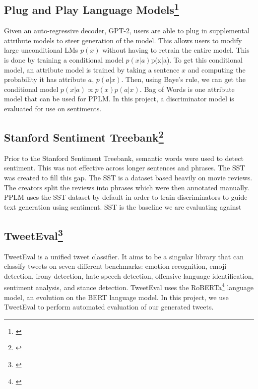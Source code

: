 \documentclass[11pt]{article}
\begin{document}
\subsection{Plug and Play Language Models\footnote{\citep{pplm-paper}}}
Given an auto-regressive decoder, GPT-2, users are able to plug in supplemental attribute models to steer generation of the model.  This allows users to modify large unconditional LMs \begin{math}p(x)\end{math} without having to retrain the entire model.  This is done by training a conditional model \begin{math}p(x|a)\end{math}p(x|a).  To get this conditional model, an attribute model is trained by taking a sentence \begin{math}x\end{math} and computing the probability it has attribute \begin{math}a\end{math}, \begin{math}p(a|x)\end{math}.  Then, using Baye’s rule, we can get the conditional model \begin{math}p(x|a) \propto p(x)p(a|x)\end{math}.  Bag of Words is one attribute model that can be used for PPLM.  In this project, a discriminator model is evaluated for use on sentiments.

\subsection{Stanford Sentiment Treebank\footnote{\citep{sst-paper}}}
Prior to the Stanford Sentiment Treebank, semantic words were used to detect sentiment.  This was not effective across longer sentences and phrases.  The SST was created to fill this gap.  The SST is a dataset based heavily on movie reviews.  The creators split the reviews into phrases which were then annotated manually.  PPLM uses the SST dataset by default in order to train discriminators to guide text generation using sentiment. SST is the baseline we are evaluating against

\subsection{TweetEval\footnote{\citep{tweet-eval-paper}}}
TweetEval is a unified tweet classifier.  It aims to be a singular library that can classify tweets on seven different benchmarks: emotion recognition, emoji detection, irony detection, hate speech detection, offensive language identification, sentiment analysis, and stance detection.  TweetEval uses the RoBERTa\footnote{\citep{roberta-paper}} language model, an evolution on the BERT language model.  In this project, we use TweetEval to perform automated evaluation of our generated tweets.
\end{document}
